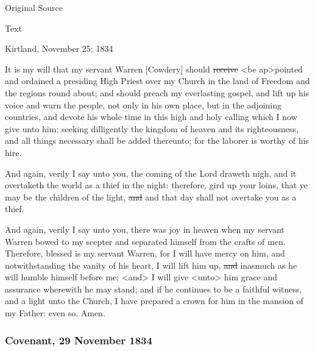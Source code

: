 				\begin{description}
					\item[Original Source]
				\end{description}
				
				
				\begin{description}
					\item[Text]
				\end{description}
				
					Kirtland, November 25; 1834
					
					It is my will that my servant Warren [Cowdery] should \sout{receive} <be ap>pointed and ordained a presiding High Priest over my Church in the land of Freedom and the regions round about; and should preach my everlasting gospel, and lift up his voice and warn the people, not only in his own place, but in the adjoining countries, and devote his whole time in this high and holy calling which I now give unto him; seeking dilligently the kingdom of heaven and its righteousness, and all things necessary shall be added thereunto; for the laborer is worthy of his hire.
					
					And again, verily I say unto you, the coming of the Lord draweth nigh, and it overtaketh the world as a thief in the night: therefore, gird up your loins, that ye may be the children of the light, \sout{and} and that day shall not overtake you as a thief.
					
					And again, verily I say unto you, there was joy in heaven when my servant Warren bowed to my scepter and separated himself from the crafts of men. Therefore, blessed is my servant Warren, for I will have mercy on him, and notwithstanding the vanity of his heart, I will lift him up, \sout{and} inasmuch as he will humble himself before me; <and> I will give <unto> him grace and assurance wherewith he may stand; and if he continues to be a faithful witness, and a light unto the Church, I have prepared a crown for him in the mansion of my Father: even so. Amen.
					
		\subsubsection{Covenant, 29 November 1834}
			\label{EMS-1834-JS-29-NOV-1834}
			
